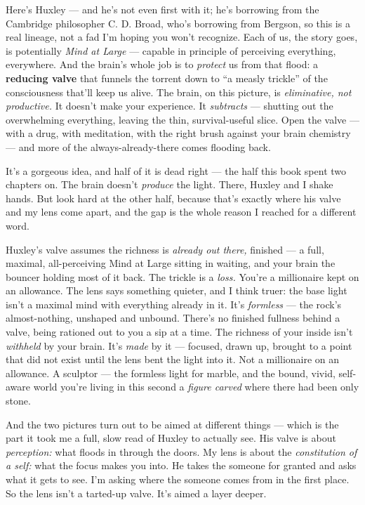 \documentclass[11pt,openany]{book}
\begin{document}
Here’s Huxley — and he’s not even first with it; he’s borrowing from the Cambridge philosopher C. D. Broad, who’s borrowing from Bergson, so this is a real lineage, not a fad I’m hoping you won’t recognize. Each of us, the story goes, is potentially \textit{Mind at Large} — capable in principle of perceiving everything, everywhere. And the brain’s whole job is to \textit{protect} us from that flood: a \textbf{reducing valve} that funnels the torrent down to “a measly trickle” of the consciousness that’ll keep us alive. The brain, on this picture, is \textit{eliminative, not productive.} It doesn’t make your experience. It \textit{subtracts} — shutting out the overwhelming everything, leaving the thin, survival-useful slice. Open the valve — with a drug, with meditation, with the right brush against your brain chemistry — and more of the always-already-there comes flooding back.

It’s a gorgeous idea, and half of it is dead right — the half this book spent two chapters on. The brain doesn’t \textit{produce} the light. There, Huxley and I shake hands. But look hard at the other half, because that’s exactly where his valve and my lens come apart, and the gap is the whole reason I reached for a different word.

Huxley’s valve assumes the richness is \textit{already out there,} finished — a full, maximal, all-perceiving Mind at Large sitting in waiting, and your brain the bouncer holding most of it back. The trickle is a \textit{loss.} You’re a millionaire kept on an allowance. The lens says something quieter, and I think truer: the base light isn’t a maximal mind with everything already in it. It’s \textit{formless} — the rock’s almost-nothing, unshaped and unbound. There’s no finished fullness behind a valve, being rationed out to you a sip at a time. The richness of your inside isn’t \textit{withheld} by your brain. It’s \textit{made} by it — focused, drawn up, brought to a point that did not exist until the lens bent the light into it. Not a millionaire on an allowance. A sculptor — the formless light for marble, and the bound, vivid, self-aware world you’re living in this second a \textit{figure carved} where there had been only stone.

And the two pictures turn out to be aimed at different things — which is the part it took me a full, slow read of Huxley to actually see. His valve is about \textit{perception:} what floods in through the doors. My lens is about the \textit{constitution of a self:} what the focus makes you into. He takes the someone for granted and asks what it gets to see. I’m asking where the someone comes from in the first place. So the lens isn’t a tarted-up valve. It’s aimed a layer deeper.
\end{document}
